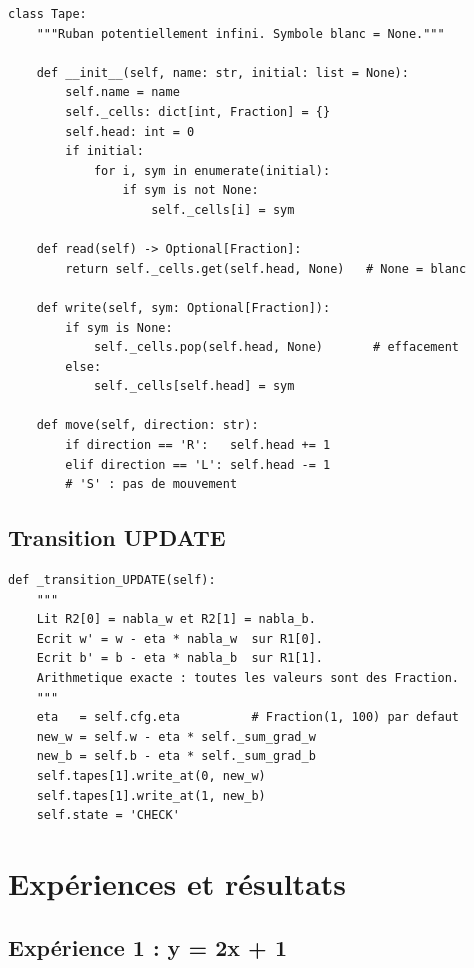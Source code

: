 \documentclass[12pt, a4paper, oneside]{report}
\begin{document}
\begin{lstlisting}[caption={Implémentation de la classe Tape}, label={lst:tape}]
class Tape:
    """Ruban potentiellement infini. Symbole blanc = None."""

    def __init__(self, name: str, initial: list = None):
        self.name = name
        self._cells: dict[int, Fraction] = {}
        self.head: int = 0
        if initial:
            for i, sym in enumerate(initial):
                if sym is not None:
                    self._cells[i] = sym

    def read(self) -> Optional[Fraction]:
        return self._cells.get(self.head, None)   # None = blanc

    def write(self, sym: Optional[Fraction]):
        if sym is None:
            self._cells.pop(self.head, None)       # effacement
        else:
            self._cells[self.head] = sym

    def move(self, direction: str):
        if direction == 'R':   self.head += 1
        elif direction == 'L': self.head -= 1
        # 'S' : pas de mouvement
\end{lstlisting}

\subsection{Transition UPDATE}

\begin{lstlisting}[caption={Transition $\delta$(UPDATE $\to$ CHECK)}, label={lst:update}]
def _transition_UPDATE(self):
    """
    Lit R2[0] = nabla_w et R2[1] = nabla_b.
    Ecrit w' = w - eta * nabla_w  sur R1[0].
    Ecrit b' = b - eta * nabla_b  sur R1[1].
    Arithmetique exacte : toutes les valeurs sont des Fraction.
    """
    eta   = self.cfg.eta          # Fraction(1, 100) par defaut
    new_w = self.w - eta * self._sum_grad_w
    new_b = self.b - eta * self._sum_grad_b
    self.tapes[1].write_at(0, new_w)
    self.tapes[1].write_at(1, new_b)
    self.state = 'CHECK'
\end{lstlisting}

\section{Expériences et résultats}

\subsection{Expérience 1 : y = 2x + 1}
\end{document}
